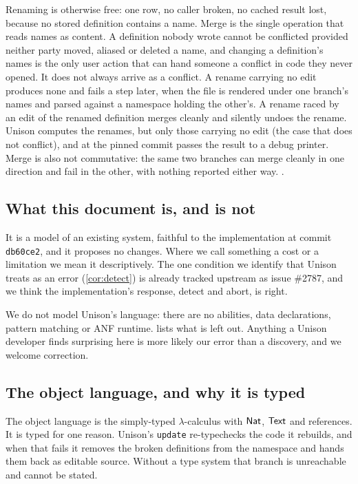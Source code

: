 \documentclass[11pt]{article}
\theoremstyle{definition}
\theoremstyle{plain}
\theoremstyle{remark}
\begin{document}
Renaming is otherwise free: one row, no caller broken, no cached result lost, because no stored
definition contains a name. Merge is the single operation that reads names as content. A definition
nobody wrote cannot be conflicted provided neither party moved, aliased or deleted a name, and
changing a definition's names is the only user action that can hand someone a conflict in code they
never opened. It does not always arrive as a conflict. A rename carrying no edit produces none and
fails a step later, when the file is rendered under one branch's names and parsed against a namespace
holding the other's. A rename raced by an edit of the renamed definition merges cleanly and silently
undoes the rename. Unison computes the renames, but only those carrying no edit (the case that does
not conflict), and at the pinned commit passes the result to a debug printer. Merge is also not
commutative: the same two branches can merge cleanly in one direction and fail in the other, with
nothing reported either way.
.

\subsection{What this document is, and is not}

It is a model of an existing system, faithful to the implementation at commit \texttt{db60ce2}, and
it proposes no changes. Where we call something a cost or a limitation we mean it descriptively. The
one condition we identify that Unison treats as an error (\cref{cor:detect}) is already tracked
upstream as issue \#2787, and we think the implementation's response, detect and abort, is right.

We do not model Unison's language: there are no abilities, data declarations, pattern matching or
ANF runtime.  lists what is left out. Anything a Unison developer finds
surprising here is more likely our error than a discovery, and we welcome correction.

\subsection{The object language, and why it is typed}

The object language is the simply-typed $\lambda$-calculus with $\mathsf{Nat}$, $\mathsf{Text}$ and references.
It is typed for one reason. Unison's \texttt{update} re-typechecks the code it rebuilds, and when
that fails it removes the broken definitions from the namespace and hands them back as editable
source. Without a type system that branch is unreachable and cannot be stated.
\end{document}
